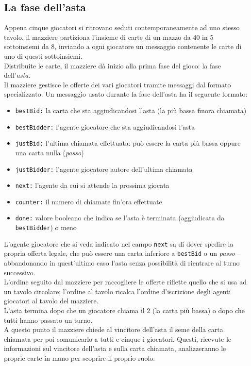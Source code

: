 \subsection{La fase dell'asta}
Appena cinque giocatori si ritrovano seduti contemporaneamente ad uno stesso tavolo, il mazziere partiziona l'insieme di carte di un mazzo da 40 in 5 sottoinsiemi da 8, inviando a ogni giocatore un messaggio contenente le carte di uno di questi sottoinsiemi.\\
Distribuite le carte, il mazziere dà inizio alla prima fase del gioco: la fase dell'\emph{asta}.\\
Il mazziere gestisce le offerte dei vari giocatori tramite messaggi dal formato specializzato. 
Un messaggio usato durante la fase dell'asta ha il seguente formato:
\begin{itemize}
   \item \texttt{bestBid:}  la carta che sta aggiudicandosi l'asta (la più bassa finora chiamata)
   \item \texttt{bestBidder:} l'agente giocatore che sta aggiudicandosi l'asta
   \item \texttt{justBid:}  l'ultima chiamata effettuata: può essere la carta più bassa oppure una carta nulla (\emph{passo})
   \item \texttt{justBidder:} l'agente giocatore autore dell'ultima chiamata
   \item \texttt{next:}  l'agente da cui si attende la prossima giocata
   \item \texttt{counter:}  il numero di chiamate fin'ora effettuate
   \item \texttt{done:}  valore booleano che indica se l'asta è terminata (aggiudicata da \texttt{bestBidder}) o meno
\end{itemize}
L'agente giocatore che si veda indicato nel campo \texttt{next} sa di dover spedire la propria offerta legale, che può essere una carta inferiore a \texttt{bestBid} o un \emph{passo} -- abbandonando in quest'ultimo caso l'asta senza possibilità di rientrare al turno successivo.\\
L'ordine seguito dal mazziere per raccogliere le offerte riflette quello che si usa ad un tavolo circolare; l'ordine al tavolo ricalca l'ordine d'iscrizione degli agenti giocatori al tavolo del mazziere.\\
L'asta termina dopo che un giocatore chiama il 2 (la carta più bassa) o dopo che tutti hanno passato un turno.\\
A questo punto il mazziere chiede al vincitore dell'asta il seme della carta chiamata per poi comunicarlo a tutti e cinque i giocatori.
Questi, ricevute le informazioni sul vincitore dell'asta e sulla carta chiamata, analizzeranno le proprie carte in mano per scoprire il proprio ruolo.


